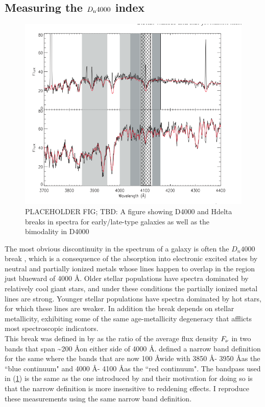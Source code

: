 \subsection{Measuring the $D_{\rm n}4000$ index}
\begin{figure}
\includegraphics[width=\textwidth]{figures/spectra_placeholder.png}
\caption[Short figure name.]{ PLACEHOLDER FIG; TBD: A figure showing D4000 and Hdelta breaks in spectra for early/late-type galaxies as well as the bimodality in D4000
\label{fig:early_late_type}}
\end{figure}
The most obvious discontinuity in the spectrum of a galaxy is often the $D_{n}4000$ break \citep{1999ApJ...527...54B}, which is a consequence of the absorption into electronic excited states by neutral and partially ionized metals whose lines happen to overlap in the region just blueward of 4000 \AA.  Older stellar populations have spectra dominated by relatively cool giant stars, and under these conditions the partially ionized metal lines are strong. Younger stellar populations have spectra dominated by hot stars, for which these lines are weaker. In addition the break
depends on stellar metallicity, exhibiting some of the same age-metallicity degeneracy that afflicts most spectroscopic indicators.\\ 

This break was defined in by \citet{bruzual_a._spectral_1983-2} as the ratio of the average flux density $F_{\rm \nu}$ in two bands that span \textasciitilde200 \AA on either side of 4000 \AA. \citet{1999ApJ...527...54B} defined a narrow band definition for the same where the bands that are now 100 \AA wide with 3850 \AA - 3950 \AA as the ``blue continuum" and 4000 \AA - 4100 \AA as the ``red continuum". The bandpass used in \citet{kauffmann_stellar_2003} (\ref{fig:early_late_type}) is the same as the one introduced by \citet{1999ApJ...527...54B} and their motivation for doing so is that the narrow definition is more insensitive to reddening effects. I reproduce these measurements using the same narrow band definition.\\

